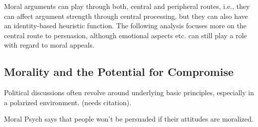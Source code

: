 
Moral arguments can play through both, central and peripheral routes, i.e., they can affect argument strength through central processing, but they can also have an identity-based heuristic function. The following analysis focuses more on the central route to persuasion, although emotional aspects etc. can still play a role with regard to moral appeals.


\subsection{Morality and the Potential for Compromise}


Political discussions often revolve around underlying basic principles, especially in a polarized environment. (needs citation).

Moral Psych says that people won't be persuaded if their attitudes are moralized.

